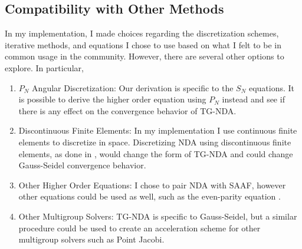 \subsection{Compatibility with Other Methods}
In my implementation, I made choices regarding the discretization schemes, iterative methods, and equations I chose to use based on what I felt to be in common usage in the community. However, there are several other options to explore. In particular, 
\begin{enumerate}
\item $P_N$ Angular Discretization:
Our derivation is specific to the $S_N$ equations. It is possible to derive the higher order equation using $P_N$ instead \cite{zheng-thesis} and see if there is any effect on the convergence behavior of TG-NDA. 
\item Discontinuous Finite Elements:
In my implementation I use continuous finite elements to discretize in space. Discretizing NDA using discontinuous finite elements, as done in \cite{Schunert2017}, would change the form of TG-NDA and could change Gauss-Seidel convergence behavior. 
\item Other Higher Order Equations:
I chose to pair NDA with SAAF, however other equations could be used as well, such as the even-parity equation \cite{Noh1996}.
\item Other Multigroup Solvers:
TG-NDA is specific to Gauss-Seidel, but a similar procedure could be used to create an acceleration scheme for other multigroup solvers such as Point Jacobi.
\end{enumerate}

